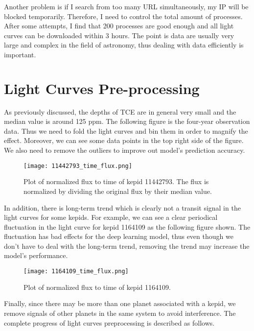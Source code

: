     Another problem is if I search from too many URL simultaneously, my IP will be blocked
    temporarily. Therefore, I need to control the total amount of processes. After some 
    attempts, I find that 200 processes are good enough and all light curves can be 
    downloaded within 3 hours. The point is data are usually very large and complex 
    in the field of astronomy, thus dealing with data efficiently is important.

    
  \section{Light Curves Pre-processing}
    As previously discussed, the depths of TCE are in general very small and the median 
    value is around 125 ppm. The following figure is the four-year observation data. 
    Thus we need to fold the light curves and bin them in order to magnify the effect.
    Moreover, we can see some data points in the top right side of the figure. We also 
    need to remove the outliers to improve out model's prediction accuracy.
    
    \begin{figure}[!htp]
      \centering
      \texttt{[image: 11442793\_time\_flux.png]}
      \caption[Plot of normalized flux to time of kepid 11442793.]
        {Plot of normalized flux to time of kepid 11442793. The flux is normalized by 
        dividing the original flux by their median value.}
      \label{fig: 11442793_time_flux}
    \end{figure}

    In addition, there is long-term trend which is clearly not a transit signal
    in the light curves for some kepids. For example, we can see a clear periodical 
    fluctuation in the light curve for kepid 1164109 as the following figure shown.
    The fluctuation has bad effects for the deep learning model, thus even though we don't 
    have to deal with the long-term trend, removing the trend may increase the model's 
    performance.

    \begin{figure}[!htp]
      \centering
      \texttt{[image: 1164109\_time\_flux.png]}
      \caption[Plot of normalized flux to time of kepid 1164109.]
        {Plot of normalized flux to time of kepid 1164109.}
      \label{fig: 1164109_time_flux}
    \end{figure}

    Finally, since there may be more than one planet associated with a kepid, we remove 
    signals of other planets in the same system to avoid interference. The complete 
    progress of light curves preprocessing is described as follows.

